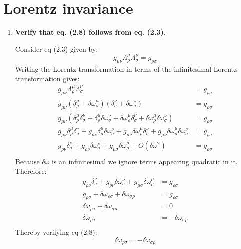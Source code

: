 \documentclass[9pt]{report}
\begin{document}
  \chapter{Lorentz invariance}
  \begin{enumerate}
    \item \textbf{Verify that eq. (2.8) follows from eq. (2.3).}

      Consider eq (2.3) given by:
      \[
        g_{\mu\nu} \Lambda^\mu_\rho \Lambda^\nu_\sigma = g_{\rho\sigma}
      \]
      Writing the Lorentz transformation in terms of the infinitesimal
      Lorentz transformation gives:
      \[
        \begin{align}
        g_{\mu\nu} \Lambda^\mu_\rho \Lambda^\nu_\sigma &= g_{\rho\sigma}\\
        g_{\mu\nu} (\delta^\mu_\rho + \delta\omega^\mu_\rho)(\delta^\nu_\sigma+\delta\omega^\nu_\sigma) &= g_{\rho\sigma}\\
        g_{\mu\nu} (\delta^\mu_\rho \delta^\nu_\sigma + \delta^\mu_\rho \delta\omega^\nu_\sigma+\delta\omega^\mu_\rho\delta^\nu_\sigma+\delta\omega^\mu_\rho\delta\omega^\nu_\sigma) &= g_{\rho\sigma}\\
        g_{\mu\nu}\delta^\mu_\rho \delta^\nu_\sigma + g_{\mu\nu}\delta^\mu_\rho \delta\omega^\nu_\sigma+g_{\mu\nu}\delta\omega^\mu_\rho\delta^\nu_\sigma+g_{\mu\nu}\delta\omega^\mu_\rho\delta\omega^\nu_\sigma &= g_{\rho\sigma}\\
        g_{\rho\nu}\delta^\nu_\sigma + g_{\rho\nu} \delta\omega^\nu_\sigma+g_{\mu\sigma}\delta\omega^\mu_\rho+O(\delta\omega^2)&= g_{\rho\sigma}\\
        \end{align}
      \]
      Because $\delta\omega$ is an infinitesimal we ignore terms appearing quadratic
      in it. Therefore:
      \[
        \begin{align}
        g_{\rho\nu}\delta^\nu_\sigma + g_{\rho\nu} \delta\omega^\nu_\sigma+g_{\mu\sigma}\delta\omega^\mu_\rho&= g_{\rho\sigma}\\
        g_{\rho\sigma}+ \delta\omega_{\rho\sigma}+\delta\omega_{\sigma\rho}&= g_{\rho\sigma}\\
        \delta\omega_{\rho\sigma}+\delta\omega_{\sigma\rho}&= 0\\
        \delta\omega_{\rho\sigma}&=-\delta\omega_{\sigma\rho}\\
        \end{align}
      \]
      Thereby verifying eq (2.8):
      \[
          \delta\omega_{\rho\sigma} = -\delta\omega_{\sigma\rho}
      \]
  \end{enumerate}
\end{document}
